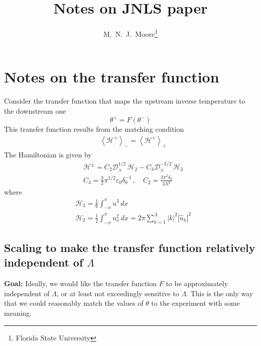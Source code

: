 \documentclass[11pt]{article}
\newcommand{\abs}[1]{\left| #1 \right|}
\newcommand{\mean}[1]{\left< #1 \right>}
\newcommand{\eps}{\varepsilon}
\newcommand{\dx}{\, dx}
\newcommand{\lamfac}{N}
\newcommand{\drat}{\mathcal{D}}
\newcommand{\dratupdn}{\drat_{\pm}}
\newcommand{\epsup}{\eps_0}
\newcommand{\delup}{\delta_0}
\newcommand{\uhat}{\hat{u}}
\newcommand{\Ham}{\mathcal{H}}
\newcommand{\Hdn}{\Ham^{+}}
\newcommand{\Hupdn}{\Ham^{\pm}}
\newcommand{\Hthree}{\Ham_{3}}
\newcommand{\Htwo}{\Ham_{2}}
\newcommand{\thup}{\theta^{-}}
\newcommand{\thdn}{\theta^{+}}
\newcommand{\meanup}[1]{\mean{#1}_{-}}
\newcommand{\meandn}[1]{\mean{#1}_{+}}
\begin{document}
\title{Notes on JNLS paper}

\author{
M.~N.~J.~Moore\thanks{Florida State University} }
\maketitle


\section{Notes on the transfer function}

Consider the transfer function that maps the upstream inverse temperature to the downstream one
\begin{equation}
\thdn = F(\thup)
\end{equation}
This transfer function results from the matching condition
\begin{align}
\label{statmatch}
&\meanup{\Hdn} = \meandn{\Hdn}
\end{align}
The Hamiltonian is given by
\begin{align}
\label{Hamiltonian}
&\Hupdn = C_2 \dratupdn^{1/2} \, \Htwo - C_3 \dratupdn^{-3/2} \, \Hthree \\
&C_3 = \frac{3}{2} \pi^{1/2} \epsup \delup^{-1} \, , \quad
C_2 = \frac{2 \pi^2 \delup}{3 \lamfac^2} 
\end{align}
where
\begin{align}
\label{H3H2}
&\Hthree = \frac{1}{6} \int_{-\pi}^{\pi} u^3 \dx	\\
&\Htwo = \frac{1}{2} \int_{-\pi}^{\pi} u_x^2 \dx =
2 \pi \sum_{k=1}^{\Lambda} \abs{k}^ 2\abs{\uhat_k}^2
\end{align}

\subsection{Scaling to make the transfer function relatively independent of $\Lambda$}
{\bf Goal:} Ideally, we would like the transfer function $F$ to be approximately independent of $\Lambda$, or at least not exceedingly sensitive to $\Lambda$. This is the only way that we could reasonably match the values of $\theta$ to the experiment with some meaning.
\end{document}
